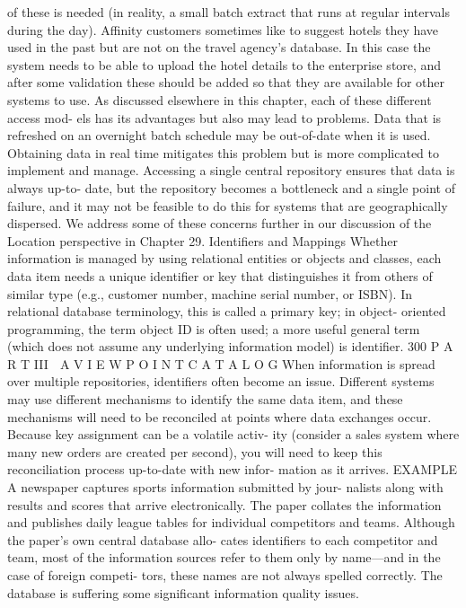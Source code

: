 of these is needed (in reality, a small batch extract that runs at regular
intervals during the day).
Affinity customers sometimes like to suggest hotels they have used
in the past but are not on the travel agency’s database. In this case the
system needs to be able to upload the hotel details to the enterprise
store, and after some validation these should be added so that they are
available for other systems to use.
As discussed elsewhere in this chapter, each of these different access mod-
els has its advantages but also may lead to problems. Data that is refreshed on
an overnight batch schedule may be out-of-date when it is used. Obtaining data
in real time mitigates this problem but is more complicated to implement and
manage. Accessing a single central repository ensures that data is always up-to-
date, but the repository becomes a bottleneck and a single point of failure, and it
may not be feasible to do this for systems that are geographically dispersed.
We address some of these concerns further in our discussion of the Location
perspective in Chapter 29.
Identifiers and Mappings
Whether information is managed by using relational entities or objects and
classes, each data item needs a unique identifier or key that distinguishes it
from others of similar type (e.g., customer number, machine serial number, or
ISBN). In relational database terminology, this is called a primary key; in object-
oriented programming, the term object ID is often used; a more useful general
term (which does not assume any underlying information model) is identifier.
300
 P A R T III  A V I E W P O I N T C A T A L O G
When information is spread over multiple repositories, identifiers often
become an issue. Different systems may use different mechanisms to identify
the same data item, and these mechanisms will need to be reconciled at points
where data exchanges occur. Because key assignment can be a volatile activ-
ity (consider a sales system where many new orders are created per second),
you will need to keep this reconciliation process up-to-date with new infor-
mation as it arrives.
EXAMPLE A newspaper captures sports information submitted by jour-
nalists along with results and scores that arrive electronically. The paper
collates the information and publishes daily league tables for individual
competitors and teams. Although the paper’s own central database allo-
cates identifiers to each competitor and team, most of the information
sources refer to them only by name—and in the case of foreign competi-
tors, these names are not always spelled correctly.
The database is suffering some significant information quality issues.
